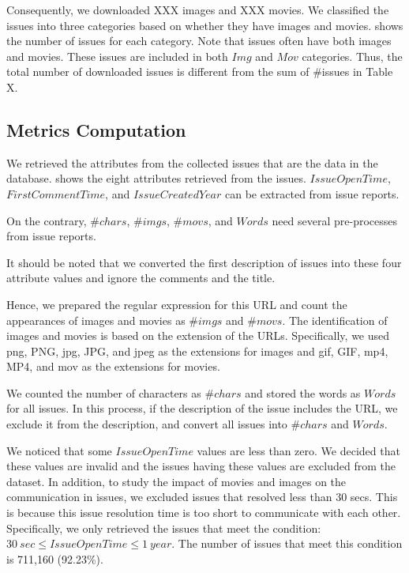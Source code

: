 
Consequently, we downloaded XXX images and XXX movies. 
We classified the issues into three categories based on 
whether they have images and movies. 
 shows the number of issues for each category. Note that issues often have both images and movies. These issues are included in both $Img$ and $Mov$ categories. Thus, the total number of downloaded issues is different from the sum of \#issues in Table X. 

% 

\subsection{Metrics Computation}

We retrieved the attributes from the collected issues 
that are the data in the database.  shows the eight attributes 
retrieved from the issues. 
$IssueOpenTime$, $FirstCommentTime$,
and $IssueCreatedYear$ can be extracted from issue reports. 

On the contrary, $\#chars$, $\#imgs$, $\#movs$, and $Words$ need several pre-processes from issue reports. 

It should be noted that we converted the first description of 
issues into these four attribute values and 
ignore the comments and the title.

Hence, we prepared the regular expression for this URL and 
count the appearances of images and movies as $\#imgs$ and $\#movs$. 
The identification of images and movies is based on the extension of 
the URLs. 
Specifically, we used png, PNG, jpg, JPG, and jpeg as 
the extensions for images and 
gif, GIF, mp4, MP4, and mov as the extensions for movies.

We counted the number of characters as $\#chars$ and 
stored the words as $Words$ for all issues. 
In this process, if the description of the issue 
includes the URL, we exclude it from the description, 
and convert all issues into $\#chars$ and $Words$.

We noticed that some $IssueOpenTime$ values are less than zero. 
We decided that these values are invalid and the issues having 
these values are excluded from the dataset. 
In addition, to study the impact of movies and images on 
the communication in issues, 
we excluded issues that resolved less than 30 secs. 
This is because this issue resolution time is too short 
to communicate with each other. 
Specifically, we only retrieved the issues that meet 
the condition: $30\ sec \leq IssueOpenTime \leq 1\ year$.
The number of issues that meet this condition is 711,160 (92.23\%).